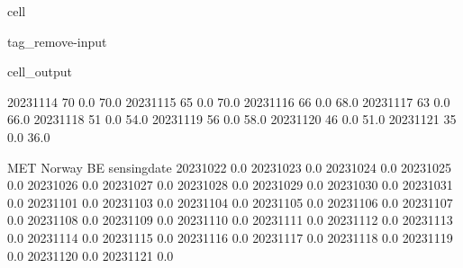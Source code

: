 \documentclass[letterpaper,10pt,english]{jupyterBook}
\begin{document}
\begin{sphinxuseclass}{cell}
\begin{sphinxuseclass}{tag_remove-input}
\begin{sphinxVerbatimOutput}
\begin{sphinxuseclass}{cell_output}
\begin{sphinxVerbatim}[commandchars=\\\{\}]
2023\PYGZhy{}11\PYGZhy{}14               70                    0.0                   70.0   
2023\PYGZhy{}11\PYGZhy{}15               65                    0.0                   70.0   
2023\PYGZhy{}11\PYGZhy{}16               66                    0.0                   68.0   
2023\PYGZhy{}11\PYGZhy{}17               63                    0.0                   66.0   
2023\PYGZhy{}11\PYGZhy{}18               51                    0.0                   54.0   
2023\PYGZhy{}11\PYGZhy{}19               56                    0.0                   58.0   
2023\PYGZhy{}11\PYGZhy{}20               46                    0.0                   51.0   
2023\PYGZhy{}11\PYGZhy{}21               35                    0.0                   36.0   

              MET Norway BE  
sensing\PYGZus{}date                 
2023\PYGZhy{}10\PYGZhy{}22              0.0  
2023\PYGZhy{}10\PYGZhy{}23              0.0  
2023\PYGZhy{}10\PYGZhy{}24              0.0  
2023\PYGZhy{}10\PYGZhy{}25              0.0  
2023\PYGZhy{}10\PYGZhy{}26              0.0  
2023\PYGZhy{}10\PYGZhy{}27              0.0  
2023\PYGZhy{}10\PYGZhy{}28              0.0  
2023\PYGZhy{}10\PYGZhy{}29              0.0  
2023\PYGZhy{}10\PYGZhy{}30              0.0  
2023\PYGZhy{}10\PYGZhy{}31              0.0  
2023\PYGZhy{}11\PYGZhy{}01              0.0  
2023\PYGZhy{}11\PYGZhy{}03              0.0  
2023\PYGZhy{}11\PYGZhy{}04              0.0  
2023\PYGZhy{}11\PYGZhy{}05              0.0  
2023\PYGZhy{}11\PYGZhy{}06              0.0  
2023\PYGZhy{}11\PYGZhy{}07              0.0  
2023\PYGZhy{}11\PYGZhy{}08              0.0  
2023\PYGZhy{}11\PYGZhy{}09              0.0  
2023\PYGZhy{}11\PYGZhy{}10              0.0  
2023\PYGZhy{}11\PYGZhy{}11              0.0  
2023\PYGZhy{}11\PYGZhy{}12              0.0  
2023\PYGZhy{}11\PYGZhy{}13              0.0  
2023\PYGZhy{}11\PYGZhy{}14              0.0  
2023\PYGZhy{}11\PYGZhy{}15              0.0  
2023\PYGZhy{}11\PYGZhy{}16              0.0  
2023\PYGZhy{}11\PYGZhy{}17              0.0  
2023\PYGZhy{}11\PYGZhy{}18              0.0  
2023\PYGZhy{}11\PYGZhy{}19              0.0  
2023\PYGZhy{}11\PYGZhy{}20              0.0  
2023\PYGZhy{}11\PYGZhy{}21              0.0  
\end{sphinxVerbatim}

\end{sphinxuseclass}\end{sphinxVerbatimOutput}

\end{sphinxuseclass}
\end{sphinxuseclass}
\end{document}
